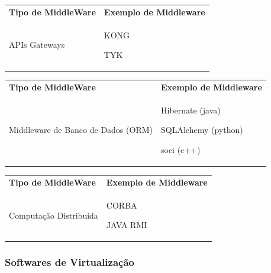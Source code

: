 \documentclass[
]{book}
\begin{document}
\begin{longtable}[]{@{}
  >{\centering\arraybackslash}p{}
  >{\centering\arraybackslash}p{}@{}}
\toprule\noalign{}
\endhead
\bottomrule\noalign{}
\endlastfoot
\textbf{Tipo de MiddleWare} & \textbf{Exemplo de Middleware} \\
APIs Gateways & KONG

TYK \\
\end{longtable}

\begin{longtable}[]{@{}
  >{\centering\arraybackslash}p{}
  >{\centering\arraybackslash}p{}@{}}
\toprule\noalign{}
\endhead
\bottomrule\noalign{}
\endlastfoot
\textbf{Tipo de MiddleWare} & \textbf{Exemplo de Middleware} \\
Middleware de Banco de Dados (ORM) & Hibernate (java)

SQLAlchemy (python)

soci (c++) \\
\end{longtable}

\begin{longtable}[]{@{}
  >{\centering\arraybackslash}p{}
  >{\centering\arraybackslash}p{}@{}}
\toprule\noalign{}
\endhead
\bottomrule\noalign{}
\endlastfoot
\textbf{Tipo de MiddleWare} & \textbf{Exemplo de Middleware} \\
Computação Distribuida & CORBA

JAVA RMI \\
\end{longtable}

\subsubsection{Softwares de Virtualização}\label{softwares-de-virtualizauxe7uxe3o}
\end{document}
